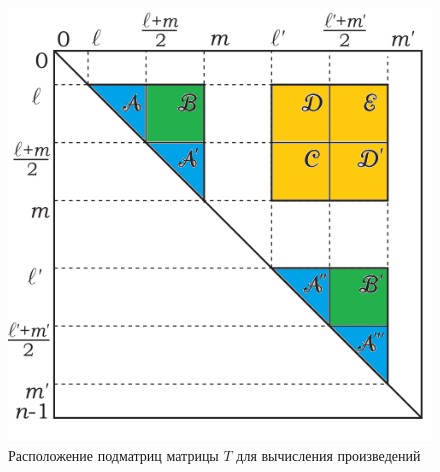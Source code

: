 \documentclass{spbau-diploma}
\begin{document}
\begin{figure}
\centering
\includegraphics{sub1.jpg}
\caption{Расположение подматриц матрицы $T$ для вычисления произведений}
\label{submatrices2}
\end{figure}
\end{document}
